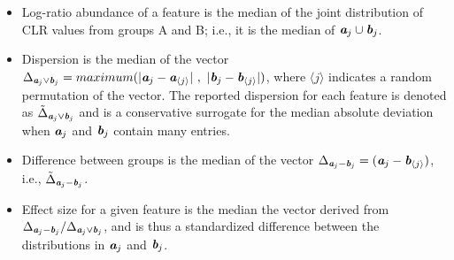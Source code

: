 \documentclass[a0,portrait]{a0poster}
\begin{document}
\begin{multicols}{2}
 
\begin{itemize}
\item{Log-ratio abundance} of a feature is the median of the joint distribution of CLR values from  groups A and B; i.e., it is the median of $ \textit{\textbf{a}}_j \cup \textit{\textbf{b}}_j$. 

\item{Dispersion} is the median of the vector $\Delta_{\textit{\textbf{a}}_j\lor \textit{\textbf{b}}_j}  = maximum(|\textit{\textbf{a}}_{j} - \textit{\textbf{a}}_{\langle j \rangle}|~,~|\textit{\textbf{b}}_{j} -\textit{\textbf{b}}_{\langle j \rangle}| )$, where $\langle j \rangle$ indicates a random permutation of the vector. The reported dispersion for each feature is denoted as $\tilde{\Delta}_{\textit{\textbf{a}}_j\lor \textit{\textbf{b}}_j}$ and is a conservative surrogate for the median absolute deviation when $\textit{\textbf{a}}_j$ and $\textit{\textbf{b}}_j$ contain many entries. 

\item{Difference} between groups is the median of the vector $\Delta_{\textit{\textbf{a}}_j-\textit{\textbf{b}}_j}  = (\textit{\textbf{a}}_{j} - \textit{\textbf{b}}_{\langle j \rangle})$, i.e., $\tilde{\Delta}_{\textit{\textbf{a}}_j-\textit{\textbf{b}}_j}$.

\item{Effect size} for a given feature is the median  the vector derived from $\Delta_{\textit{\textbf{a}}_j-\textit{\textbf{b}}_j} / \Delta_{\textit{\textbf{a}}_j\lor \textit{\textbf{b}}_j}$, and is thus a standardized difference between the distributions in $\textit{\textbf{a}}_{j}$ and $\textit{\textbf{b}}_{j}$.
\end{itemize}




\end{multicols}
\end{document}
